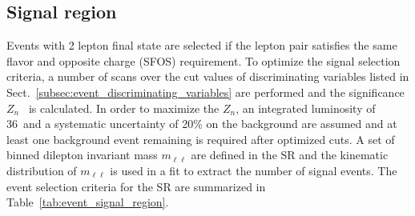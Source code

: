 \subsection{Signal region}
\label{subsec:event_signal_region}
Events with 2 lepton final state are selected if the lepton pair satisfies the same flavor and opposite charge (SFOS) requirement.
To optimize the signal selection criteria, a number of scans over the cut values of discriminating variables listed in Sect.~\ref{subsec:event_discriminating_variables} are performed and the significance $Z_{n}$~\cite{RooStats::NumberCountingUtils::BinomialExpZ} is calculated.
In order to maximize the $Z_{n}$, an integrated luminosity of 36~\ifb and a systematic uncertainty of 20\% on the background are assumed and at least one background event remaining is required after optimized cuts.
A set of binned dilepton invariant mass $m_{\ell \ell}$ are defined in the SR and the kinematic distribution of $m_{\ell \ell}$ is used in a fit to extract the number of signal events.
The event selection criteria for the SR are summarized in Table~\ref{tab:event_signal_region}.


